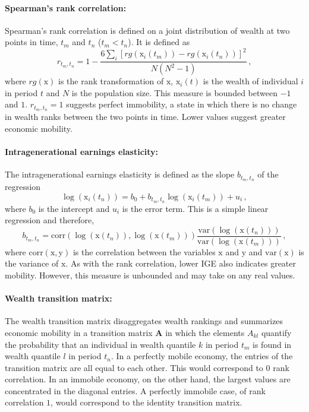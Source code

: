 \documentclass[11pt]{article}
\newcommand{\be}{\begin{equation}}
\newcommand{\ee}{\end{equation}}
\numberwithin{equation}{section}
\begin{document}
\paragraph{Spearman's rank correlation:} Spearman's rank correlation is defined on a joint distribution of wealth at two points in time, $t_m$ and $t_n$ ($t_m < t_n$). It is defined as
%
\be
    r_{t_m,t_n} = 1 - \frac{6\sum_i \left[rg\left(\mathrm{x}_i\left(t_m\right)\right) - rg\left(\mathrm{x}_i\left(t_n\right)\right)\right]^2}{N\left(N^2-1\right)}\,,
\ee
%
where $rg(\mathrm{x})$ is the rank transformation of $\mathrm{x}$, $\mathrm{x}_i(t)$ is the wealth of individual $i$ in period $t$ and $N$ is the population size. This measure is bounded between $-1$ and $1$. $r_{t_m,t_n} = 1$ suggests perfect immobility, a state in which there is no change in wealth ranks between the two points in time. Lower values suggest greater economic mobility.

\paragraph{Intragenerational earnings elasticity:} The intragenerational earnings elasticity is defined as the slope $b_{t_m,t_n}$ of the regression
%
\be
   \log\left(\mathrm{x}_i\left(t_n\right)\right) = b_0 + b_{t_m,t_n} \log\left(\mathrm{x}_i\left(t_m\right)\right) + u_i\,,
\ee
%
where $b_0$ is the intercept and $u_i$ is the error term. This is a simple linear regression and therefore,
%
\be
    b_{t_m,t_n} = \mathrm{corr}\left(\log\left(\mathrm{x}\left(t_n\right)\right),\log\left(\mathrm{x}\left(t_m\right)\right)\right) \frac{\mathrm{var}\left(\log\left(\mathrm{x}\left(t_n\right)\right)\right)}{\mathrm{var}\left(\log\left(\mathrm{x}\left(t_m\right)\right)\right)}\,,
    \label{eq:iee-estimation}
\ee
%
where $\mathrm{corr}(\mathrm{x},\mathrm{y})$ is the correlation between the variables $\mathrm{x}$ and $\mathrm{y}$ and $\mathrm{var}(\mathrm{x})$ is the variance of $\mathrm{x}$. As with the rank correlation, lower IGE also indicates greater mobility. However, this measure is unbounded and may take on any real values.

\paragraph{Wealth transition matrix:} The wealth transition matrix disaggregates wealth rankings and summarizes economic mobility in a
transition matrix $\mathbf{A}$ in which the elements $A_{kl}$ quantify the probability that an individual in wealth quantile $k$ in period $t_m$ is found in wealth quantile $l$ in period $t_n$. In a perfectly mobile economy, the entries of the transition matrix are all equal to each other. This would correspond to $0$ rank correlation. In an immobile economy, on the other hand, the largest values are concentrated in the diagonal entries. A perfectly immobile case, of rank correlation $1$, would correspond to the identity transition matrix.
\end{document}
